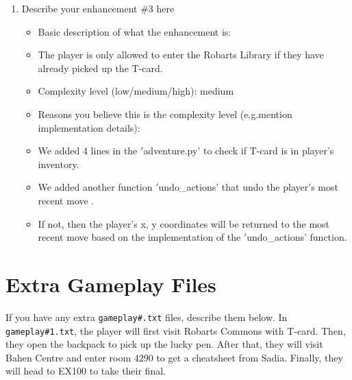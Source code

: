 \documentclass[11pt]{article}
\begin{document}
\begin{enumerate}
\item Describe your enhancement \#3 here
	\begin{itemize}
	\item Basic description of what the enhancement is:
        \item The player is only allowed to enter the Robarts Library if they have already picked up the T-card.
	\item Complexity level (low/medium/high): medium
	\item Reasons you believe this is the complexity level (e.g.mention implementation details):
        \item We added 4 lines in the \('\)adventure.py' to check if T-card is in player's inventory.
        \item We added another function \('\)undo\_actions' that undo the player's most recent move .
        \item If not, then the player's x, y coordinates will be returned to the most recent move based on the implementation of the \('\)undo\_actions' function.
	\end{itemize}

\end{enumerate}


\section*{Extra Gameplay Files}

If you have any extra \texttt{gameplay\#.txt} files, describe them below.
    In \texttt{gameplay\#1.txt}, the player will first visit Robarts Commons with T-card. 
    Then, they open the backpack to pick up the lucky pen. 
    After that, they will visit Bahen Centre and enter room 4290 to get a cheatsheet from Sadia.
    Finally, they will head to EX100 to take their final.
\end{document}
